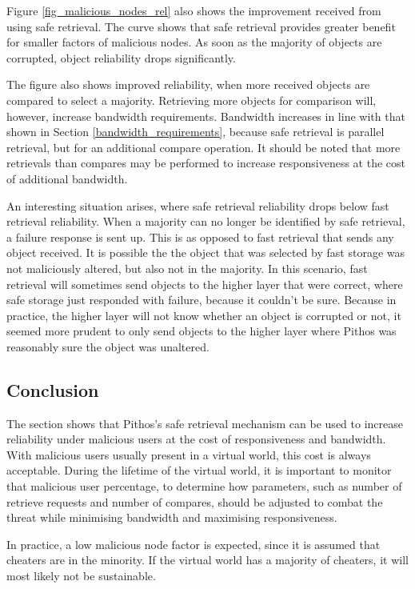 Figure \ref{fig_malicious_nodes_rel} also shows the improvement received from using safe retrieval. The curve shows that safe retrieval provides greater benefit for smaller factors of malicious nodes. As soon as the majority of objects are corrupted, object reliability drops significantly.

The figure also shows improved reliability, when more received objects are compared to select a majority. Retrieving more objects for comparison will, however, increase bandwidth requirements. Bandwidth increases in line with that shown in Section \ref{bandwidth_requirements}, because safe retrieval is parallel retrieval, but for an additional compare operation. It should be noted that more retrievals than compares may be performed to increase responsiveness at the cost of additional bandwidth.

An interesting situation arises, where safe retrieval reliability drops below fast retrieval reliability. When a majority can no longer be identified by safe retrieval, a failure response is sent up. This is as opposed to fast retrieval that sends any object received. It is possible the the object that was selected by fast storage was not maliciously altered, but also not in the majority. In this scenario, fast retrieval will sometimes send objects to the higher layer that were correct, where safe storage just responded with failure, because it couldn't be sure. Because in practice, the higher layer will not know whether an object is corrupted or not, it seemed more prudent to only send objects to the higher layer where Pithos was reasonably sure the object was unaltered.

\subsection{Conclusion}

The section shows that Pithos's safe retrieval mechanism can be used to increase reliability under malicious users at the cost of responsiveness and bandwidth. With malicious users usually present in a virtual world, this cost is always acceptable. During the lifetime of the virtual world, it is important to monitor that malicious user percentage, to determine how parameters, such as number of retrieve requests and number of compares, should be adjusted to combat the threat while minimising bandwidth and maximising responsiveness.

In practice, a low malicious node factor is expected, since it is assumed that cheaters are in the minority. If the virtual world has a majority of cheaters, it will most likely not be sustainable.

